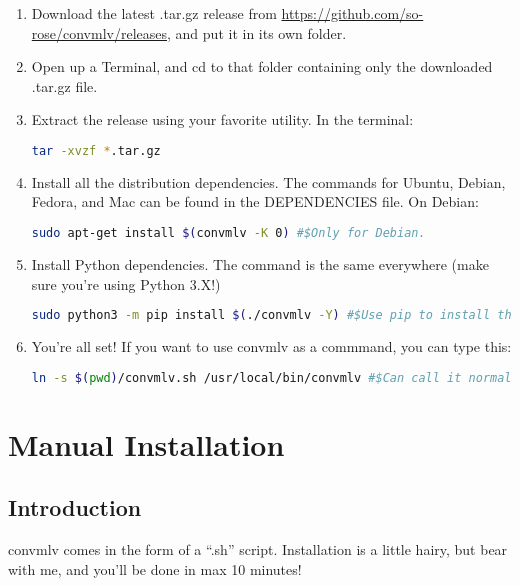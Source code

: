 \documentclass[a4paper,12pt]{article}
\begin{document}
\begin{enumerate}
	\item Download the latest .tar.gz release from \url{https://github.com/so-rose/convmlv/releases}, and put it in its own folder.
	\item Open up a Terminal, and cd to that folder containing only the downloaded .tar.gz file.
	\item Extract the release using your favorite utility. In the terminal:
	
\begin{lstlisting}[language=bash]
	tar -xvzf *.tar.gz
\end{lstlisting}

	\item Install all the distribution dependencies. The commands for Ubuntu, Debian, Fedora, and Mac can be found in the DEPENDENCIES file. On Debian:
	
\begin{lstlisting}[language=bash]
	sudo apt-get install $(convmlv -K 0) #$Only for Debian.
\end{lstlisting}

	\item Install Python dependencies. The command is the same everywhere (make sure you're using Python 3.X!)
	
\begin{lstlisting}[language=bash]
	sudo python3 -m pip install $(./convmlv -Y) #$Use pip to install things!
\end{lstlisting}

	\item You're all set! If you want to use convmlv as a commmand, you can type this:
	
\begin{lstlisting}[language=bash]
	ln -s $(pwd)/convmlv.sh /usr/local/bin/convmlv #$Can call it normally now.
\end{lstlisting}

\end{enumerate}		

\section{Manual Installation}

	\subsection{Introduction}
		
		convmlv comes in the form of a ``.sh'' script. Installation is a little hairy, but bear with me, and you'll be done in max 10 minutes!\\
		
\end{document}
